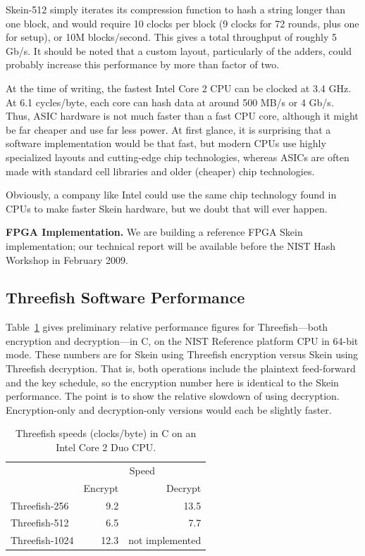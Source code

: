 \documentclass[11pt,twoside]{article}
\begin{document}
Skein-512 simply iterates its compression function to hash a string longer than one block, and would require 10 clocks per block (9 clocks for 72 rounds, plus one for setup), or 10M blocks/second. This gives a total throughput of roughly 5 Gb/s. It should be noted that a custom layout, particularly of the adders, could probably increase this performance by more than factor of two.

At the time of writing, the fastest Intel Core 2 CPU can be clocked at 3.4 GHz. At 6.1 cycles/byte, each core can hash data at around  500 MB/s or 4 Gb/s. Thus, ASIC hardware is not much faster than a fast CPU core, although it might be far cheaper and use far less power. At first glance, it is surprising that a software implementation would be that fast, but modern CPUs use highly specialized layouts and cutting-edge chip technologies, whereas ASICs are often made with standard cell libraries and older (cheaper) chip technologies.

Obviously, a company like Intel could use the same chip technology found in CPUs to make faster Skein hardware, but we doubt that will ever happen.

{\bf FPGA Implementation.}  We are building a reference FPGA Skein implementation; our technical report will be available before the NIST Hash Workshop in February 2009.

\subsection{Threefish Software Performance}

Table~\ref{tab:ThreefishSpeed} gives preliminary relative performance figures for Threefish---both encryption and decryption---in C, on the NIST Reference platform CPU in 64-bit mode. These numbers are for Skein using Threefish encryption versus Skein using Threefish decryption. That is, both operations include the plaintext feed-forward and the key schedule, so the encryption number here is identical to the Skein performance. The point is to show the relative slowdown of using decryption. Encryption-only and decryption-only versions would each be slightly faster.
%
\begin{table}[htb]
  \begin{center}
    \begin{tabular}{|l|rr|}
    \hline
    & \multicolumn{2}{c|}{Speed} \\
    & Encrypt & Decrypt \\
    \hline
    Threefish-256  &  9.2 & 13.5 \\
    Threefish-512  &  6.5 &  7.7 \\
    Threefish-1024 & 12.3 & not implemented \\
    \hline
    \end{tabular}
  \end{center}
  \caption{Threefish speeds (clocks/byte) in C on an Intel Core 2 Duo CPU.}
  \label{tab:ThreefishSpeed}
\end{table}
\end{document}
